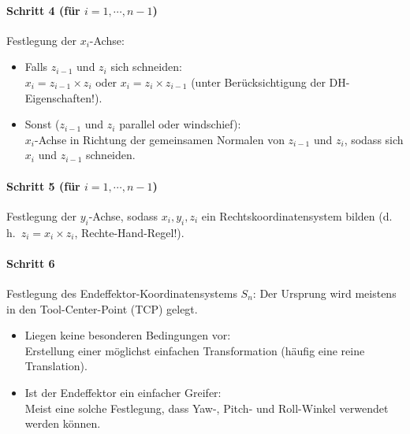 \documentclass[a4paper, 11pt, accentcolor = tud3b]{tudreport}
\renewcommand{\dh}{d.\,h.~}
\begin{document}
					\paragraph{Schritt 4 (für \( i = 1, \cdots, n - 1 \))}
						Festlegung der \(x_i\)-Achse:
						\begin{itemize}
							\item Falls \(z_{i - 1}\) und \(z_i\) sich schneiden: \\ \( x_i = z_{i - 1} \times z_i \) oder \( x_i = z_i \times z_{i - 1} \) (unter Berücksichtigung der DH-Eigenschaften!).
							\item Sonst (\(z_{i - 1}\) und \(z_i\) parallel oder windschief): \\ \(x_i\)-Achse in Richtung der gemeinsamen Normalen von \(z_{i - 1}\) und \(z_i\), sodass sich \(x_i\) und \(z_{i - 1}\) schneiden.
						\end{itemize}
					
					\paragraph{Schritt 5 (für \( i = 1, \cdots, n - 1 \))}
						Festlegung der \(y_i\)-Achse, sodass \( x_i, y_i, z_i \) ein Rechtskoordinatensystem bilden (\dh \( z_i = x_i \times z_i \), Rechte-Hand-Regel!).
					
					\paragraph{Schritt 6}
						Festlegung des Endeffektor-Koordinatensystems \(S_n\): Der Ursprung wird meistens in den Tool-Center-Point (TCP) gelegt.
						\begin{itemize}
							\item Liegen keine besonderen Bedingungen vor: \\ Erstellung einer möglichst einfachen Transformation (häufig eine reine Translation).
							\item Ist der Endeffektor ein einfacher Greifer: \\ Meist eine solche Festlegung, dass Yaw-, Pitch- und Roll-Winkel verwendet werden können.
						\end{itemize}
					
\end{document}
